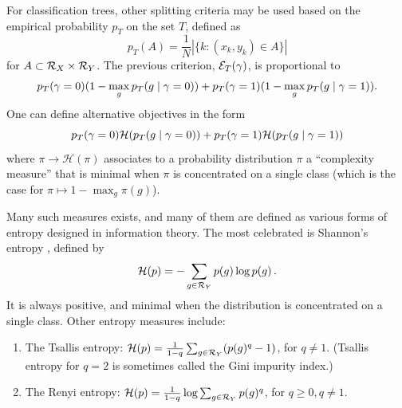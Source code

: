 \begin{example}
For classification trees, other splitting criteria may be used based on  the empirical probability $p_T$ on the set $T$, defined as 
\[
p_T(A) = \frac1 N |\{k: (x_k, y_k) \in A\}|
\]
for $A\subset {\mathcal R}_X \times {\mathcal R}_Y$.
 The previous criterion, ${\mathcal E}_{T}(\gamma)$, is proportional to 
\[
p_T(\gamma = 0) (1- \max_{g} p_T(g\mid\gamma=0)) + p_T(\gamma = 1) (1- \max_{g} p_T(g\mid \gamma=1)) .
\]
 One can define alternative objectives in the form
\[
p_T(\gamma = 0) \mathcal H (p_T(g\mid \gamma=0)) + p_T(\gamma = 1) \mathcal H (p_T(g\mid \gamma=1))
\]
where $\pi \to \mathcal H(\pi)$ associates to a probability distribution $\pi$ a ``complexity measure'' that is minimal when $\pi$ is concentrated on a single class (which is the case for $\pi \mapsto 1 - \max_g \pi(g)$).

 Many such measures exists, and many of them are defined as various forms of entropy designed in information theory.
 The most celebrated   is Shannon's entropy \citep{shannon1949communication}, defined by
\[
\mathcal H(p) =- \sum_{g\in {\mathcal R}_Y} p(g) \log p(g)\,.
\]
It 
is always positive, and minimal when the distribution is concentrated on a single class. Other entropy measures include:
\begin{enumerate}[label=$\bullet$]
\item The Tsallis entropy: $\mathcal H(p) = \frac1{1-q} \sum_{g\in {\mathcal R}_Y} (p(g)^q - 1)$, for $q\neq 1$. (Tsallis entropy for $q=2$ is sometimes called the Gini impurity index.)
\item The Renyi entropy: $\mathcal H(p) = \frac1{1-q} \log \sum_{g\in {\mathcal R}_Y} p(g)^q $, for $q\geq 0, q\neq 1$. 
\end{enumerate}
\end{example}




